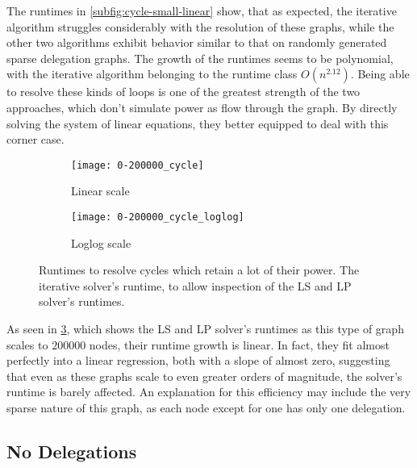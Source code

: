The runtimes in \cref{subfig:cycle-small-linear} show, that as expected, the iterative algorithm struggles considerably with the resolution of these graphs, while the other two algorithms exhibit behavior similar to that on randomly generated sparse delegation graphs. The growth of the runtimes seems to be polynomial, with the iterative algorithm belonging to the runtime class $O(n^{2.12})$. Being able to resolve these kinds of loops is one of the greatest strength of the two approaches, which don't simulate power as flow through the graph. By directly solving the system of linear equations, they better equipped to deal with this corner case.  

\begin{figure}[t]
    \centering
    \begin{subfigure}[t]{0.45\textwidth}
    	\centering
    	\texttt{[image: 0-200000\_cycle]}
    	\caption{Linear scale}
    	\label{subfig:cycle-large-linear}
    \end{subfigure}
    \hfill
    \begin{subfigure}[t]{0.45\textwidth}
        \centering
        \texttt{[image: 0-200000\_cycle\_loglog]}
        \caption{Loglog scale}
         \label{subfig:cycle-large-loglog}
    \end{subfigure}
    \caption{Runtimes to resolve cycles which retain a lot of their power. The iterative solver's runtime, to allow inspection of the LS and LP solver's runtimes.}
    \label{fig:cycle_large}
\end{figure}

As seen in \cref{fig:cycle_large}, which shows the LS and LP solver's runtimes as this type of graph scales to $200 000$ nodes, their runtime growth is linear. In fact, they fit almost perfectly into a linear regression, both with a slope of almost zero, suggesting that even as these graphs scale to even greater orders of magnitude, the solver's runtime is barely affected. An explanation for this efficiency may include the very sparse nature of this graph, as each node except for one has only one delegation.


\subsection{No Delegations}

